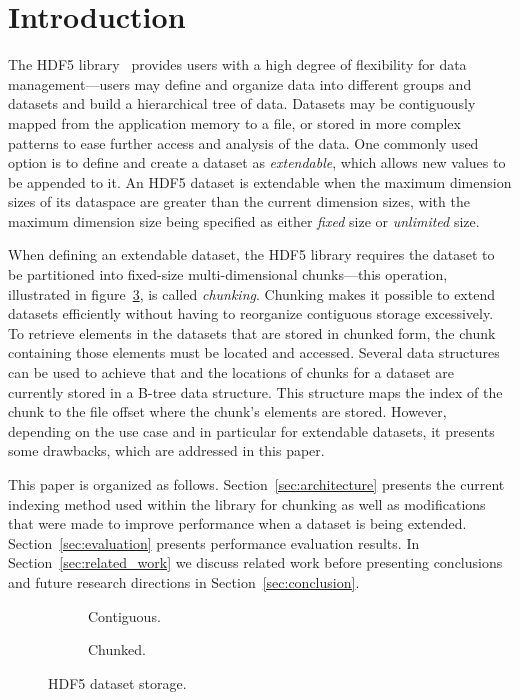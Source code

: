 
\section{Introduction}

The HDF5 library~\cite{Folk2011}\cite{Folk1999} provides users with a high degree of flexibility for data
management---users may define and organize data into different groups and
datasets and build a hierarchical tree of data. Datasets may be contiguously 
mapped from the application memory to a file, or stored in more complex 
patterns to ease further access and analysis of the data. One
commonly used option is to define and create a dataset as \textit{extendable},
which allows new values to be appended to it.
An HDF5 dataset is extendable when the maximum dimension sizes of its 
dataspace are greater than the current dimension sizes, with the maximum dimension 
size being specified as either \textit{fixed} size or \textit{unlimited} size.

When defining an extendable dataset, the HDF5 library requires the dataset
to be partitioned into fixed-size multi-dimensional chunks---this operation, 
illustrated in figure~\ref{fig:hdf5_dataset}, is called \textit{chunking}.
Chunking makes it possible to extend datasets efficiently without having to
reorganize contiguous storage excessively. To retrieve elements in the
datasets that are stored in chunked form, the chunk containing those
elements must be located and accessed. Several data structures can be used
to achieve that and the locations of chunks for a dataset are currently 
stored in a B-tree data structure. This structure maps the index of the chunk to 
the file offset where the chunk's elements are stored. However, depending
on the use case and in particular for extendable datasets, it presents some
drawbacks, which are addressed in this paper.

This paper is organized as follows. 
Section~\ref{sec:architecture} presents the 
current indexing method used within the library for chunking as well as 
modifications that were made to improve performance when a dataset is 
being extended. Section~\ref{sec:evaluation} presents performance evaluation 
results. In Section~\ref{sec:related_work} we discuss related work before
presenting conclusions and future research directions in Section~\ref{sec:conclusion}.

\begin{figure}
\begin{subfigure}[b]{.49\linewidth}
\centering

\caption{Contiguous.}
\label{fig:contiguous}
\end{subfigure}%
\hfill
\begin{subfigure}[b]{.49\linewidth}
\centering

\vspace{-15pt}
\caption{Chunked.}
\label{fig:chunked}
\end{subfigure}
\caption{HDF5 dataset storage.}
\label{fig:hdf5_dataset}
\end{figure}

